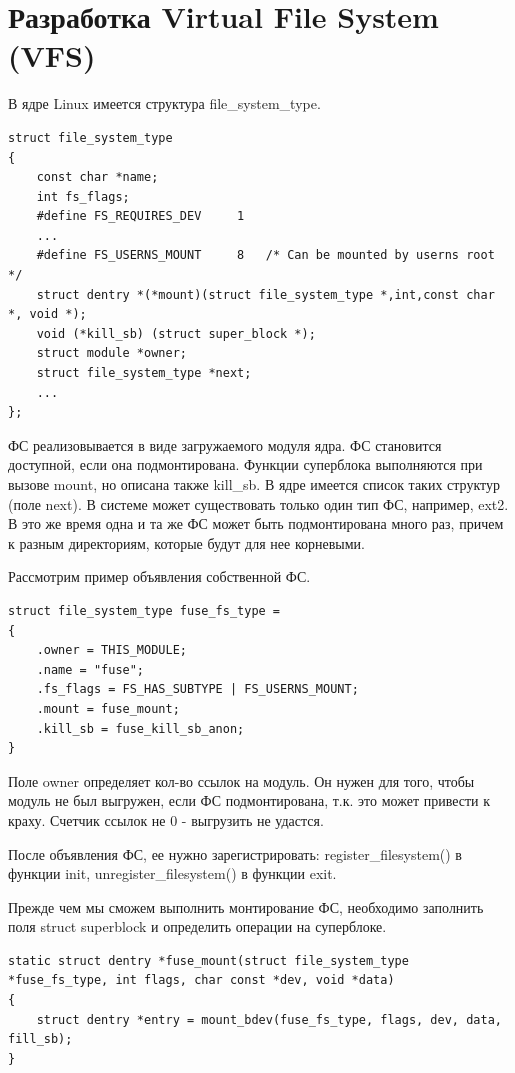 \documentclass[12pt,a4paper]{scrreprt}
\begin{document}
\section{Разработка Virtual File System (VFS)}

В ядре Linux имеется структура file\_system\_type.

\begin{lstlisting}
struct file_system_type 
{
	const char *name;
	int fs_flags;
	#define FS_REQUIRES_DEV		1  
	...
	#define FS_USERNS_MOUNT		8	/* Can be mounted by userns root */
	struct dentry *(*mount)(struct file_system_type *,int,const char *, void *);
	void (*kill_sb) (struct super_block *);
	struct module *owner;
	struct file_system_type *next;
	...
};
\end{lstlisting}

ФС реализовывается в виде загружаемого модуля ядра. ФС становится доступной, если она подмонтирована. Функции суперблока выполняются при вызове mount, но описана также kill\_sb. В ядре имеется список таких структур (поле next). В системе может существовать только один тип ФС, например, ext2. В это же время одна и та же ФС может быть подмонтирована много раз, причем к разным директориям, которые будут для нее корневыми.

Рассмотрим пример объявления собственной ФС.

\begin{lstlisting}
struct file_system_type fuse_fs_type = 
{
	.owner = THIS_MODULE;
	.name = "fuse";
	.fs_flags = FS_HAS_SUBTYPE | FS_USERNS_MOUNT;
	.mount = fuse_mount;
	.kill_sb = fuse_kill_sb_anon;
}
\end{lstlisting}

Поле owner определяет кол-во ссылок на модуль. Он нужен для того, чтобы модуль не был выгружен, если ФС подмонтирована, т.к. это может привести к краху. Счетчик ссылок не 0 - выгрузить не удастся.

После объявления ФС, ее нужно зарегистрировать: register\_filesystem() в функции init, unregister\_filesystem() в функции exit.

Прежде чем мы сможем выполнить монтирование ФС, необходимо заполнить поля struct superblock и определить операции на суперблоке.

\begin{lstlisting}
static struct dentry *fuse_mount(struct file_system_type *fuse_fs_type, int flags, char const *dev, void *data)
{
	struct dentry *entry = mount_bdev(fuse_fs_type, flags, dev, data, fill_sb);
}
\end{lstlisting}
\end{document}
